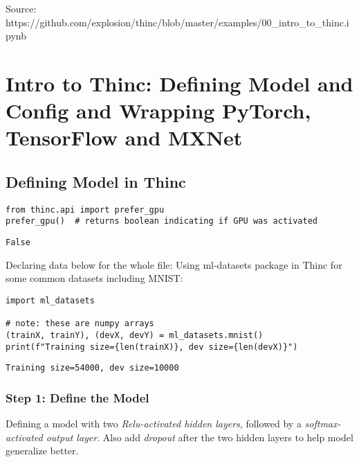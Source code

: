 \documentclass[
]{article}
\author{}
\date{}
\begin{document}
Source:
https://github.com/explosion/thinc/blob/master/examples/00\_intro\_to\_thinc.ipynb

\hypertarget{intro-to-thinc-defining-model-and-config-and-wrapping-pytorch-tensorflow-and-mxnet}{%
\section{Intro to Thinc: Defining Model and Config and Wrapping PyTorch,
TensorFlow and
MXNet}\label{intro-to-thinc-defining-model-and-config-and-wrapping-pytorch-tensorflow-and-mxnet}}

\hypertarget{defining-model-in-thinc}{%
\subsection{Defining Model in Thinc}\label{defining-model-in-thinc}}

\begin{verbatim}
from thinc.api import prefer_gpu
prefer_gpu()  # returns boolean indicating if GPU was activated
\end{verbatim}

\begin{verbatim}
False
\end{verbatim}

Declaring data below for the whole file: Using ml-datasets package in
Thinc for some common datasets including MNIST:

\begin{verbatim}
import ml_datasets

# note: these are numpy arrays
(trainX, trainY), (devX, devY) = ml_datasets.mnist()
print(f"Training size={len(trainX)}, dev size={len(devX)}")
\end{verbatim}

\begin{verbatim}
Training size=54000, dev size=10000
\end{verbatim}

\hypertarget{step-1-define-the-model}{%
\subsubsection{Step 1: Define the Model}\label{step-1-define-the-model}}

Defining a model with two \emph{Relu-activated hidden layers}, followed
by a \emph{softmax-activated output layer}. Also add \emph{dropout}
after the two hidden layers to help model generalize better.
\end{document}
